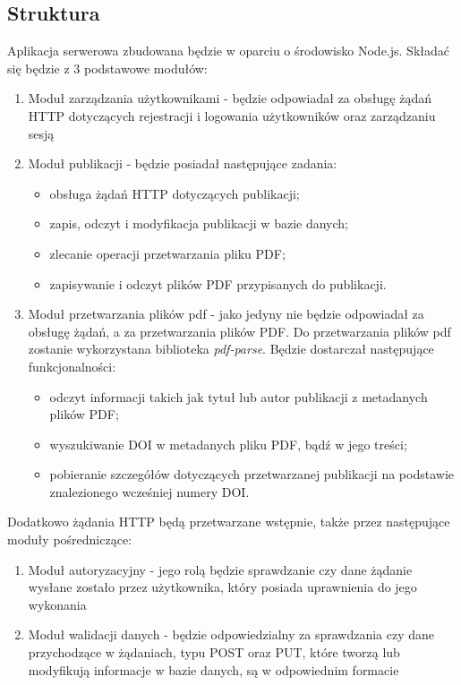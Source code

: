 \documentclass[a4paper,12pt,twoside,openany]{report}
\begin{document}
\subsection{Struktura}
Aplikacja serwerowa zbudowana będzie w oparciu o środowisko Node.js. Składać się będzie z 3 podstawowe modułów:
\begin{enumerate}
	\item Moduł zarządzania użytkownikami - będzie odpowiadał za obsługę żądań HTTP dotyczących rejestracji i logowania użytkowników oraz zarządzaniu sesją
	
	\item Moduł publikacji - będzie posiadał następujące zadania:
	\begin{itemize}
		\item obsługa żądań HTTP dotyczących publikacji;
		\item zapis, odczyt i modyfikacja publikacji w bazie danych;
		\item zlecanie operacji przetwarzania pliku PDF;
		\item zapisywanie i odczyt plików PDF przypisanych do publikacji.
	\end{itemize}
	 
	\item Moduł przetwarzania plików pdf - jako jedyny nie będzie odpowiadał za obsługę żądań, a za przetwarzania plików PDF. Do przetwarzania plików pdf zostanie wykorzystana biblioteka \textit{pdf-parse}. Będzie dostarczał następujące funkcjonalności:
	\begin{itemize}
		\item odczyt informacji takich jak tytuł lub autor publikacji z metadanych plików PDF;
		\item wyszukiwanie DOI w metadanych pliku PDF, bądź w jego treści;
		\item pobieranie szczegółów dotyczących przetwarzanej publikacji na podstawie znalezionego wcześniej numery DOI.
	\end{itemize}
\end{enumerate}


Dodatkowo żądania HTTP będą przetwarzane wstępnie, także przez następujące moduły pośredniczące:
\begin{enumerate}
	\item Moduł autoryzacyjny - jego rolą będzie sprawdzanie czy dane żądanie wysłane zostało przez użytkownika, który posiada uprawnienia do jego wykonania
	\item Moduł walidacji danych - będzie odpowiedzialny za sprawdzania czy dane przychodzące w żądaniach, typu POST oraz PUT, które tworzą lub modyfikują informacje w bazie danych, są w odpowiednim formacie
\end{enumerate}
\end{document}
